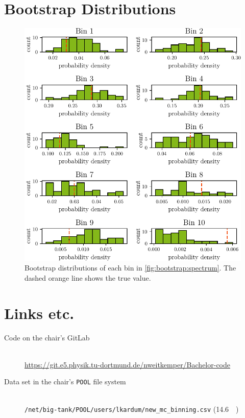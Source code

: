 %

\clearpage
\section{Bootstrap Distributions}
\begin{figure}
  \centering
  \includegraphics[scale=1]{content/plots/bootstrap:distributions_doubleheight.pdf}
  \caption{
    Bootstrap distributions of each bin in \autoref{fig:bootstrap:spectrum}.
    The dashed orange line shows the true value.
  }
  \label{fig:bootstrap:distributions}
\end{figure}


\clearpage
\section{Links etc.}
\begin{description}
  \item[Code on the chair's GitLab] \hfill \\
    \url{https://git.e5.physik.tu-dortmund.de/nweitkemper/Bachelor-code}
  \item[Data set in the chair's \texttt{POOL} file system] \hfill \\
    \texttt{/net/big-tank/POOL/users/lkardum/new\_mc\_binning.csv} (\SI{14.6}{\giga\byte})
\end{description}
